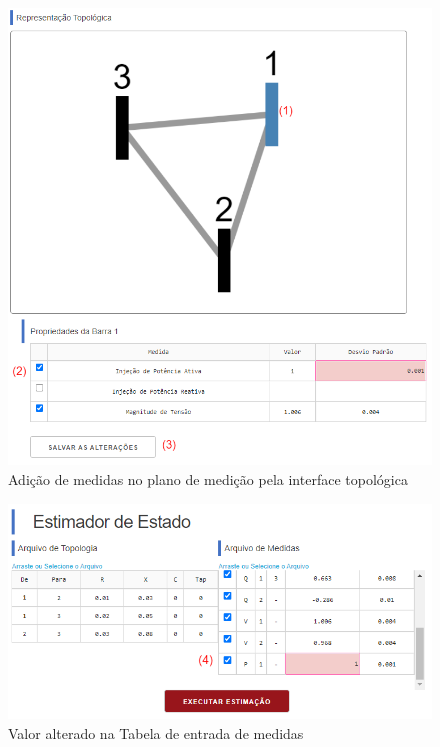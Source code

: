 \documentclass{article}
\begin{document}
\begin{figure}[H]
    \centering
    \includegraphics[scale=.45]{Imagens/Adição_de_medidas.png}
    \caption{Adição de medidas no plano de medição pela interface topológica}
    \label{fig:add_val}
\end{figure}

\begin{figure}[H]
    \centering
    \includegraphics[scale=.45]{Imagens/Confirmação_Adição_de_medidas.png}
    \caption{Valor alterado na Tabela de entrada de medidas}
    \label{fig:add_val_confirm}
\end{figure}
\end{document}
